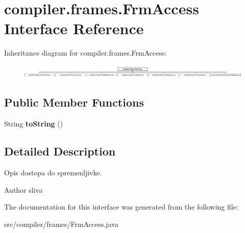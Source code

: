 \hypertarget{interfacecompiler_1_1frames_1_1_frm_access}{}\section{compiler.\+frames.\+Frm\+Access Interface Reference}
\label{interfacecompiler_1_1frames_1_1_frm_access}
Inheritance diagram for compiler.\+frames.\+Frm\+Access\+:\begin{figure}[H]
\begin{center}
\leavevmode
\includegraphics[height=0.650407cm]{interfacecompiler_1_1frames_1_1_frm_access}
\end{center}
\end{figure}
\subsection*{Public Member Functions}
\begin{DoxyCompactItemize}
\item 
\mbox{\label{interfacecompiler_1_1frames_1_1_frm_access_a33aeff0dfe777138033db0833684c950}} 
String {\bfseries to\+String} ()
\end{DoxyCompactItemize}


\subsection{Detailed Description}
Opis dostopa do spremenljivke.

\begin{DoxyAuthor}{Author}
sliva 
\end{DoxyAuthor}


The documentation for this interface was generated from the following file\+:\begin{DoxyCompactItemize}
\item 
src/compiler/frames/Frm\+Access.\+java\end{DoxyCompactItemize}
